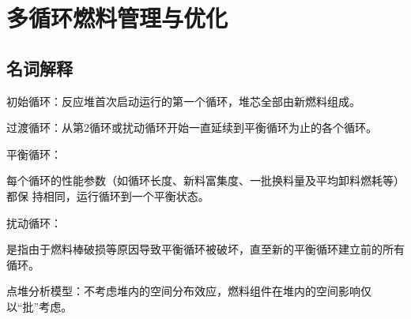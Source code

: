 \documentclass[openany]{ctexart}
\numberwithin{equation}{section} %
\begin{document}
\newpage

\section{多循环燃料管理与优化}
\subsection{名词解释}
初始循环：反应堆首次启动运行的第一个循环，堆芯全部由新燃料组成。

过渡循环：从第2循环或扰动循环开始一直延续到平衡循环为止的各个循环。

平衡循环：\hspace{0.11111em}
\begin{minipage}[t]{\linewidth}
	每个循环的性能参数（如循环长度、新料富集度、一批换料量及平均卸料燃耗等）都保\newline
	持相同，运行循环到一个平衡状态。
\end{minipage}
\vspace{0.03cm}

扰动循环：\hspace{0.11111em}
\begin{minipage}[t]{\linewidth}
	是指由于燃料棒破损等原因导致平衡循环被破坏，直至新的平衡循环建立前的所有循环。
\end{minipage}
\vspace{0.05cm}

点堆分析模型：不考虑堆内的空间分布效应，燃料组件在堆内的空间影响仅以“批”考虑。
\end{document}
